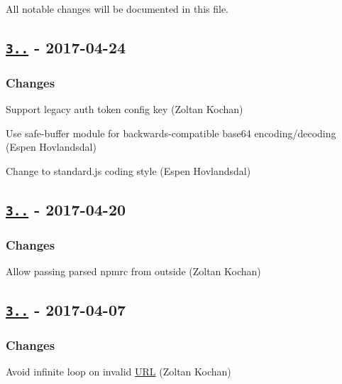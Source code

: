 All notable changes will be documented in this file.

\subsection*{\href{https://github.com/rexxars/registry-auth-token/compare/v3.2.0...v3.3.0}{\tt 3..} -\/ 2017-\/04-\/24}

\subsubsection*{Changes}


\begin{DoxyItemize}
\item Support legacy auth token config key (Zoltan Kochan)
\item Use safe-\/buffer module for backwards-\/compatible base64 encoding/decoding (Espen Hovlandsdal)
\item Change to standard.\+js coding style (Espen Hovlandsdal)
\end{DoxyItemize}

\subsection*{\href{https://github.com/rexxars/registry-auth-token/compare/v3.1.2...v3.2.0}{\tt 3..} -\/ 2017-\/04-\/20}

\subsubsection*{Changes}


\begin{DoxyItemize}
\item Allow passing parsed npmrc from outside (Zoltan Kochan)
\end{DoxyItemize}

\subsection*{\href{https://github.com/rexxars/registry-auth-token/compare/v3.1.1...v3.1.2}{\tt 3..} -\/ 2017-\/04-\/07}

\subsubsection*{Changes}


\begin{DoxyItemize}
\item Avoid infinite loop on invalid \mbox{\hyperlink{namespace_u_r_l}{U\+RL}} (Zoltan Kochan)
\end{DoxyItemize}

